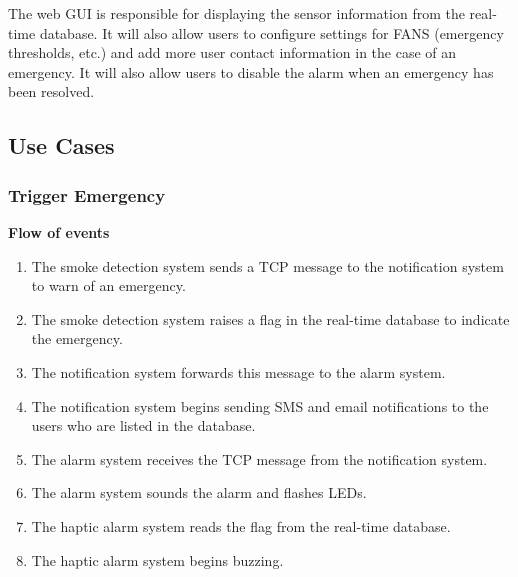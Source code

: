 The web GUI is responsible for displaying the sensor information from the real-time database. It will also allow users
to configure settings for FANS (emergency thresholds, etc.) and add more user contact information in the case of an
emergency. It will also allow users to disable the alarm when an emergency has been resolved.

\subsection{Use Cases}

\subsubsection{Trigger Emergency}

\textbf{Flow of events}
\begin{enumerate}
    \item The smoke detection system sends a TCP message to the notification system to warn of an emergency.
    \item The smoke detection system raises a flag in the real-time database to indicate the emergency.
    \item The notification system forwards this message to the alarm system.
    \item The notification system begins sending SMS and email notifications to the users who are listed in the database.
    \item The alarm system receives the TCP message from the notification system.
    \item The alarm system sounds the alarm and flashes LEDs.
    \item The haptic alarm system reads the flag from the real-time database.
    \item The haptic alarm system begins buzzing.
\end{enumerate}
